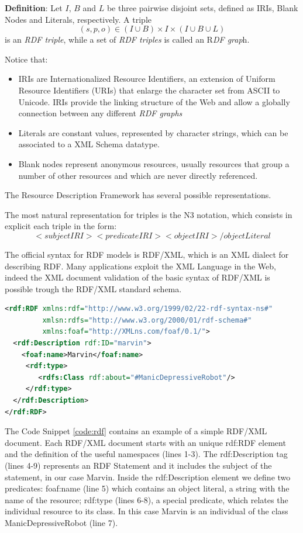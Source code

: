 \textbf{Definition}: Let $I$, $B$ and $L$ be three pairwise disjoint sets, defined as IRIs, Blank Nodes and Literals, respectively. A triple \[ (s, p, o) \in (I \cup B) × I × (I \cup B \cup L) \] is  an \textit{RDF triple}, while a set of \textit{RDF triples} is called an R\textit{DF grap}h.

Notice that:
\begin{itemize}
\item IRIs are Internationalized Resource Identifiers, an extension of Uniform Resource Identifiers (URIs) that enlarge the character set from ASCII to Unicode.  IRIs provide the linking structure of the Web and allow a globally connection between any different \textit{RDF graphs}
\item Literals are constant values, represented by character strings, which can be associated to a XML Schema datatype. 
\item Blank nodes represent anonymous resources, usually resources that group a number of other resources and which are never directly referenced.
\end{itemize}

The Resource Description Framework has several possible representations.

The most natural representation for triples is the N3 notation, which consists in explicit each triple in the form:
 \[<subjectIRI> <predicateIRI> <objectIRI>/objectLiteral\]
 
The official syntax for RDF models is RDF/XML, which is an XML dialect for describing RDF. Many applications exploit the XML Language in the Web, indeed the XML document validation of the basic syntax of RDF/XML is possible trough the RDF/XML standard schema. 

\begin{lstlisting}[language=XML, caption=An example of a simple RDF/XML document:, label=code:rdf]
<rdf:RDF xmlns:rdf="http://www.w3.org/1999/02/22-rdf-syntax-ns#"
 		 xmlsn:rdfs="http://www.w3.org/2000/01/rdf-schema#"
 		 xmlns:foaf="http://XMLns.com/foaf/0.1/">
  <rdf:Description rdf:ID="marvin">
    <foaf:name>Marvin</foaf:name>
     <rdf:type>
        <rdfs:Class rdf:about="#ManicDepressiveRobot"/>
     </rdf:type>
  </rdf:Description>
</rdf:RDF>
\end{lstlisting}

The Code Snippet \ref{code:rdf} contains an example of a simple RDF/XML document. Each RDF/XML document starts with an unique rdf:RDF element and the definition of the useful namespaces (lines 1-3). The rdf:Description tag (lines 4-9) represents an RDF Statement and it includes the subject of the statement, in our case Marvin. Inside the rdf:Description element we define two predicates: foaf:name (line 5) which contains an object literal, a string with the name of the resource; rdf:type (lines 6-8), a special predicate, which relates the individual resource to its class. In this case Marvin is an individual of the class ManicDepressiveRobot (line 7).

